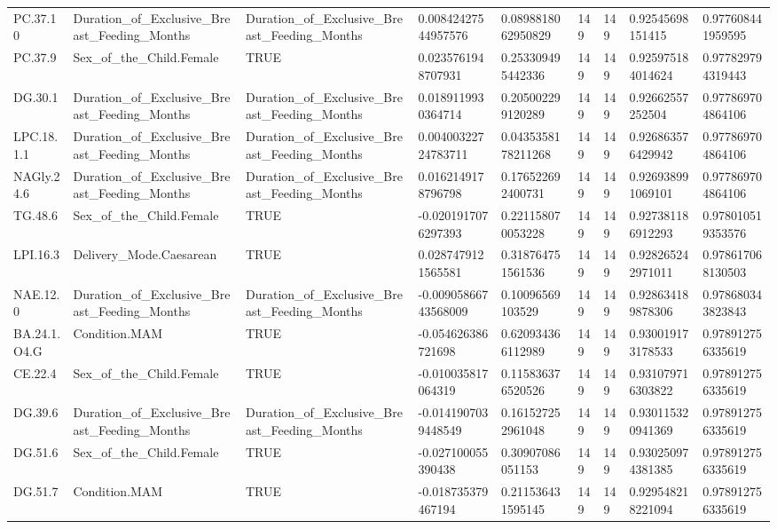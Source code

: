 \begin{longtable}{lllllllll}
PC.37.10 & Duration\_of\_Exclusive\_Breast\_Feeding\_Months & Duration\_of\_Exclusive\_Breast\_Feeding\_Months & 0.00842427544957576 & 0.0898818062950829 & 149 & 149 & 0.92545698151415 & 0.977608441959595 \\
PC.37.9 & Sex\_of\_the\_Child.Female & TRUE & 0.0235761948707931 & 0.253309495442336 & 149 & 149 & 0.925975184014624 & 0.977829794319443 \\
DG.30.1 & Duration\_of\_Exclusive\_Breast\_Feeding\_Months & Duration\_of\_Exclusive\_Breast\_Feeding\_Months & 0.0189119930364714 & 0.205002299120289 & 149 & 149 & 0.92662557252504 & 0.977869704864106 \\
LPC.18.1.1 & Duration\_of\_Exclusive\_Breast\_Feeding\_Months & Duration\_of\_Exclusive\_Breast\_Feeding\_Months & 0.00400322724783711 & 0.0435358178211268 & 149 & 149 & 0.926863576429942 & 0.977869704864106 \\
NAGly.24.6 & Duration\_of\_Exclusive\_Breast\_Feeding\_Months & Duration\_of\_Exclusive\_Breast\_Feeding\_Months & 0.0162149178796798 & 0.176522692400731 & 149 & 149 & 0.926938991069101 & 0.977869704864106 \\
TG.48.6 & Sex\_of\_the\_Child.Female & TRUE & -0.0201917076297393 & 0.221158070053228 & 149 & 149 & 0.927381186912293 & 0.978010519353576 \\
LPI.16.3 & Delivery\_Mode.Caesarean & TRUE & 0.0287479121565581 & 0.318764751561536 & 149 & 149 & 0.928265242971011 & 0.978617068130503 \\
NAE.12.0 & Duration\_of\_Exclusive\_Breast\_Feeding\_Months & Duration\_of\_Exclusive\_Breast\_Feeding\_Months & -0.00905866743568009 & 0.10096569103529 & 149 & 149 & 0.928634189878306 & 0.978680343823843 \\
BA.24.1.O4.G & Condition.MAM & TRUE & -0.054626386721698 & 0.620934366112989 & 149 & 149 & 0.930019173178533 & 0.978912756335619 \\
CE.22.4 & Sex\_of\_the\_Child.Female & TRUE & -0.010035817064319 & 0.115836376520526 & 149 & 149 & 0.931079716303822 & 0.978912756335619 \\
DG.39.6 & Duration\_of\_Exclusive\_Breast\_Feeding\_Months & Duration\_of\_Exclusive\_Breast\_Feeding\_Months & -0.0141907039448549 & 0.161527252961048 & 149 & 149 & 0.930115320941369 & 0.978912756335619 \\
DG.51.6 & Sex\_of\_the\_Child.Female & TRUE & -0.027100055390438 & 0.30907086051153 & 149 & 149 & 0.930250974381385 & 0.978912756335619 \\
DG.51.7 & Condition.MAM & TRUE & -0.018735379467194 & 0.211536431595145 & 149 & 149 & 0.929548218221094 & 0.978912756335619 \\

\end{longtable}
